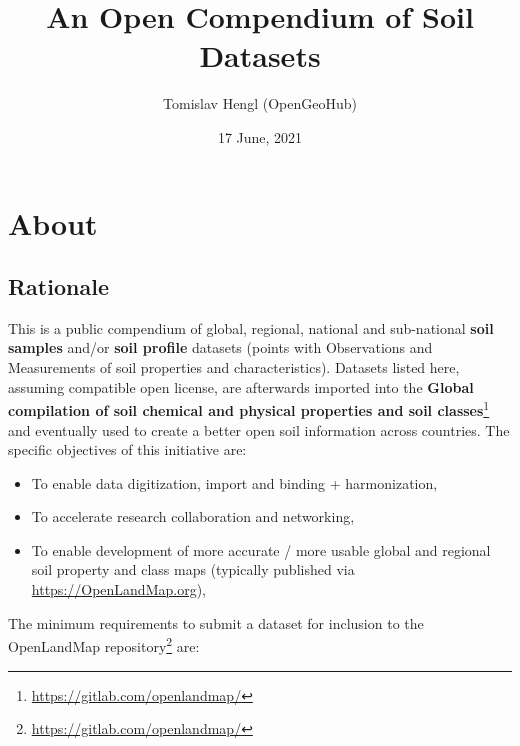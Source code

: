 \documentclass[
  graybox,natbib,nospthms]{svmono}
\title{An Open Compendium of Soil Datasets}
\author{Tomislav Hengl (OpenGeoHub)}
\date{17 June, 2021}
\providecommand{\tightlist}{%
  \setlength{\itemsep}{0pt}\setlength{\parskip}{0pt}}
\providecommand{\tightlist}{\setlength{\itemsep}{0pt}\setlength{\parskip}{0pt}}
\renewcommand{\href}[2]{#2 (\url{#1})}
\renewcommand{\href}[2]{#2\footnote{\url{#1}}}
\begin{document}
\maketitle

\thispagestyle{empty}
\begin{center}
\end{center}

\setlength{\abovedisplayskip}{-5pt}
\setlength{\abovedisplayshortskip}{-5pt}

{
\hypersetup{linkcolor=}
\setcounter{tocdepth}{1}
\tableofcontents
}
\hypertarget{about}{%
\chapter{About}\label{about}}

\hypertarget{rationale}{%
\section{Rationale}\label{rationale}}

This is a public compendium of global, regional, national and
sub-national \textbf{soil samples} and/or \textbf{soil profile} datasets (points with
Observations and Measurements of soil properties and characteristics).
Datasets listed here, assuming compatible open license, are afterwards
imported into the \href{https://gitlab.com/openlandmap/}{\textbf{Global compilation of soil chemical and physical
properties and soil classes}} and
eventually used to create a better open soil information across countries.
The specific objectives of this initiative are:

\begin{itemize}
\tightlist
\item
  To enable data digitization, import and binding + harmonization,\\
\item
  To accelerate research collaboration and networking,\\
\item
  To enable development of more accurate / more usable global and
  regional soil property and class maps (typically published via
  \url{https://OpenLandMap.org}),
\end{itemize}

The minimum requirements to submit a dataset for inclusion to \href{https://gitlab.com/openlandmap/}{the
OpenLandMap repository} are:
\end{document}
